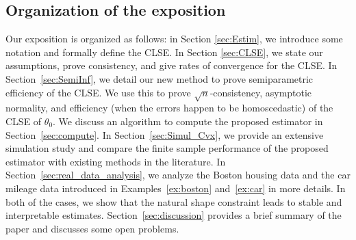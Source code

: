 






\subsection{Organization of the exposition} %
\label{sub:description_of_exposition}

Our exposition is organized as follows: in Section \ref{sec:Estim}, we introduce some notation and formally define the CLSE. In Section \ref{sec:CLSE}, we state our assumptions, prove consistency, and give rates of convergence for the  CLSE. 
In Section~\ref{sec:SemiInf}, we detail our new method to prove semiparametric efficiency of the CLSE.  We  use this to prove $\sqrt{n}$-consistency, asymptotic normality,  and efficiency (when the errors happen to be homoscedastic) of the CLSE of $\theta_0$. We discuss an algorithm to compute the proposed estimator in Section~\ref{sec:compute}. In Section~\ref{sec:Simul_Cvx}, we provide an extensive simulation study and compare the finite sample performance of the proposed estimator with existing methods in the literature. In Section~\ref{sec:real_data_analysis}, we analyze the Boston housing data \cite{harrison1978hedonic} and the car mileage data \cite{cars_1983} introduced in Examples~\ref{ex:boston} and~\ref{ex:car} in more details. In both of the cases,  we show that the natural shape constraint leads to stable and interpretable estimates.  Section~\ref{sec:discussion} provides a brief summary of the paper and discusses some open problems. 

